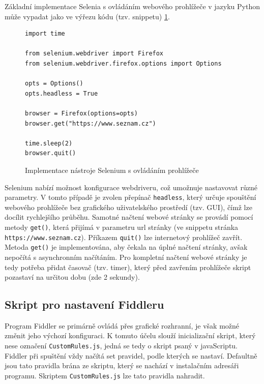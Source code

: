 \documentclass[thesis=M,czech,hidelinks]{FITthesis}[2013/05/06]
\begin{document}
Základní implementace Selenia s ovládáním webového prohlížeče v jazyku Python může vypadat jako ve výřezu kódu (tzv. snippetu) \ref{snip:selenium}.

\begin{figure}[h]               
\begin{verbatim}
import time

from selenium.webdriver import Firefox
from selenium.webdriver.firefox.options import Options

opts = Options()
opts.headless = True

browser = Firefox(options=opts)
browser.get("https://www.seznam.cz")

time.sleep(2)
browser.quit()
\end{verbatim}      
\caption{Implementace nástroje Selenium s ovládáním prohlížeče}
\label{snip:selenium}
\end{figure}
Selenium nabízí možnost konfigurace webdriveru, což umožnuje nastavovat různé parametry. V tomto případě je zvolen přepínač \texttt{headless}, který určuje spouštění webového prohlížeče bez grafického uživatelského prostředí (tzv. GUI), čímž lze docílit rychlejšího průběhu. Samotné načtení webové stránky se provádí pomocí metody \texttt{get()}, která přijímá v parametru url stránky (ve snippetu stránka \texttt{https://www.seznam.cz}). Příkazem \texttt{quit()} lze internetový prohlížeč zavřít. Metoda \texttt{get()} je implementována, aby čekala na úplné načtení stránky, avšak nepočítá s asynchronním načítáním. Pro kompletní načtení webové stránky je tedy potřeba přidat časovač (tzv. timer), který před zavřením prohlížeče skript pozastaví na určitou dobu (zde 2 sekundy).




\subsection{Skript pro nastavení Fiddleru}\label{sec:fiddler_setup}
Program Fiddler se primárně ovládá přes grafické rozhranní, je však možné změnit jeho výchozí konfiguraci. K tomuto účelu slouží inicializační skript, který nese označení \texttt{CustomRules.js}, jedná se tedy o skript psaný v javaScriptu. Fiddler při spuštění vždy načítá set pravidel, podle kterých se nastaví. Defaultně jsou tato pravidla brána ze skriptu, který se nachází v instalačním adresáři programu. Skriptem \texttt{CustomRules.js} lze tato pravidla nahradit.
\end{document}
